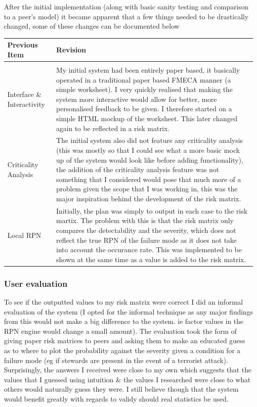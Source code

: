 \documentclass[12pt]{article} %
\begin{document}
After the initial implementation (along with basic sanity testing and comparison to a peer's model) it became apparent that a few things needed to be drastically changed, some of these changes can be documented below
\begin{center}
\begin{tabular}{p{3cm} p{10cm}}
Previous Item & Revision \\
\hline \\
Interface \& Interactivity & My initial system had been entirely paper based, it basically operated in a traditional paper based FMECA manner (a simple worksheet). I very quickly realised that making the system more interactive would allow for better, more personalised feedback to be given. I therefore started on a simple HTML mockup of the worksheet. This later changed again to be reflected in a risk matrix. \\
Criticality Analysis & The initial system also did not feature any criticality analysis (this was mostly so that I could see what a more basic mock up of the system would look like before adding functionality), the addition of the criticality analysis feature was not something that I considered would pose that much more of a problem given the scope that I was working in, this was the major inspiration behind the development of the risk matrix. \\
Local RPN & Initially, the plan was simply to output in each case to the risk martix. The problem with this is that the risk matrix only compares the detectability and the severity, which does not reflect the true RPN of the failure mode as it does not take into account the occurance rate. This was implemented to be shown at the same time as a value is added to the risk matrix.
\end{tabular}
\end{center}

\subsubsection{User evaluation}

To see if the outputted values to my risk matrix were correct I did an informal evaluation of the system (I opted for the informal technique as any major findings from this would not make a big difference to the system. ie factor values in the RPN engine would change a small amount). The evaluation took the form of giving paper risk matrices to peers and asking them to make an educated guess as to where to plot the probability against the severity given a condition for a failure mode (eg if stewards are present in the event of a terrorist attack). Surprisingly, the answers I received were close to my own which suggests that the values that I guessed using intuition \& the values I researched were close to what others would naturally guess they were. I still believe though that the system would benefit greatly with regards to validy should real statistics be used.
\end{document}
